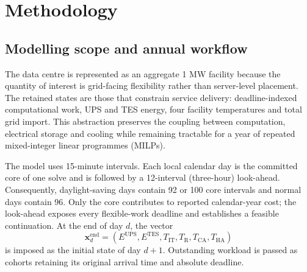 \section{Methodology}\label{sec:methodology}

\subsection{Modelling scope and annual workflow}

The data centre is represented as an aggregate 1 MW facility because the
quantity of interest is grid-facing flexibility rather than server-level
placement. The retained states are those that constrain service delivery:
deadline-indexed computational work, UPS and TES energy, four facility
temperatures and total grid import. This abstraction preserves the coupling
between computation, electrical storage and cooling while remaining tractable
for a year of repeated mixed-integer linear programmes (MILPs).

The model uses 15-minute intervals. Each local calendar day is the committed
core of one solve and is followed by a 12-interval (three-hour) look-ahead.
Consequently, daylight-saving days contain 92 or 100 core intervals and normal
days contain 96. Only the core contributes to reported calendar-year cost; the
look-ahead exposes every flexible-work deadline and establishes a feasible
continuation. At the end of day $d$, the vector
\begin{equation}
 \boldsymbol{x}_{d}^{\mathrm{end}}=
 (E^{\mathrm{UPS}},E^{\mathrm{TES}},T_{\mathrm{IT}},T_{\mathrm{R}},
 T_{\mathrm{CA}},T_{\mathrm{HA}})
\end{equation}
is imposed as the initial state of day $d+1$. Outstanding workload is passed
as cohorts retaining its original arrival time and absolute deadline.

